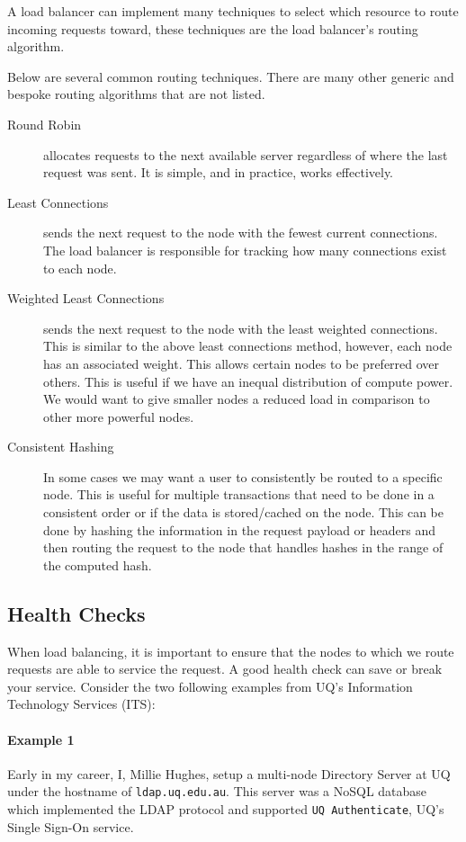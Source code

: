 \documentclass{csse4400}
\begin{document}
A load balancer can implement many techniques to select which resource to route incoming requests toward,
these techniques are the load balancer's routing algorithm.

Below are several common routing techniques.
There are many other generic and bespoke routing algorithms that are not listed.

\begin{description}
  \item[Round Robin] allocates requests to the next available server regardless of where the last request was sent.
      It is simple, and in practice, works effectively.
  \item[Least Connections] sends the next request to the node with the fewest current connections.
      The load balancer is responsible for tracking how many connections exist to each node.
  \item[Weighted Least Connections] sends the next request to the node with the least weighted connections. This is similar to the above least connections method, however, each node has an associated weight.
      This allows certain nodes to be preferred over others.
      This is useful if we have an inequal distribution of compute power.
      We would want to give smaller nodes a reduced load in comparison to other more powerful nodes.
  \item[Consistent Hashing] In some cases we may want a user to consistently be routed to a specific node.
      This is useful for multiple transactions that need to be done in a consistent order or if the data is stored/cached on the node.
      This can be done by hashing the information in the request payload or headers and then routing the request to the node that handles hashes in the range of the computed hash.
\end{description}

\subsection{Health Checks}

When load balancing, it is important to ensure that the nodes to which we route requests are able to service the request.
A good health check can save or break your service.
Consider the two following examples from UQ's Information Technology Services (ITS):

\paragraph{Example 1} Early in my career, I, Millie Hughes, setup a multi-node Directory Server at UQ under the hostname of \texttt{ldap.uq.edu.au}.
This server was a NoSQL database which implemented the LDAP protocol and supported \texttt{UQ Authenticate},
UQ's Single Sign-On service.
\end{document}
